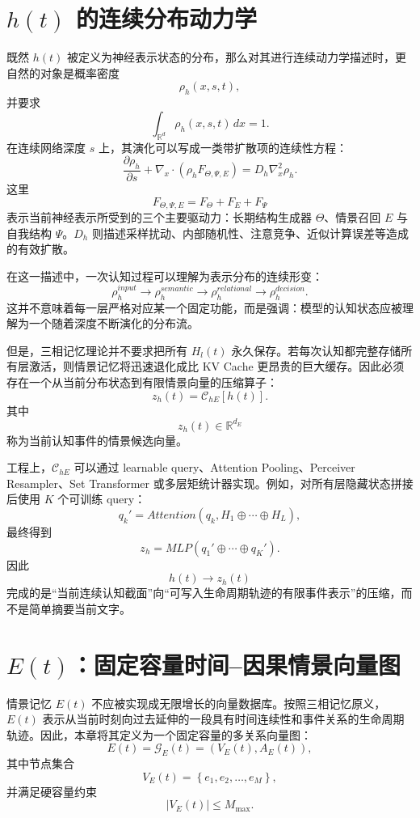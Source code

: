 \section{$h(t)$ 的连续分布动力学}

既然 $h(t)$ 被定义为神经表示状态的分布，那么对其进行连续动力学描述时，更自然的对象是概率密度
\[
\rho_h(x,s,t),
\]
并要求
\[
\int_{\mathbb{R}^{d}}
\rho_h(x,s,t)\,dx
=
1.
\]
在连续网络深度 $s$ 上，其演化可以写成一类带扩散项的连续性方程：
\[
\frac{\partial \rho_h}{\partial s}
+
\nabla_x\cdot
\left(
\rho_h F_{\Theta,\Psi,E}
\right)
=
D_h\nabla_x^2\rho_h.
\]
这里
\[
F_{\Theta,\Psi,E}
=
F_\Theta
+
F_E
+
F_\Psi
\]
表示当前神经表示所受到的三个主要驱动力：长期结构生成器 $\Theta$、情景召回 $E$ 与自我结构 $\Psi$。$D_h$ 则描述采样扰动、内部随机性、注意竞争、近似计算误差等造成的有效扩散。

在这一描述中，一次认知过程可以理解为表示分布的连续形变：
\[
\rho_h^{input}
\rightarrow
\rho_h^{semantic}
\rightarrow
\rho_h^{relational}
\rightarrow
\rho_h^{decision}.
\]
这并不意味着每一层严格对应某一个固定功能，而是强调：模型的认知状态应被理解为一个随着深度不断演化的分布流。

但是，三相记忆理论并不要求把所有 $H_l(t)$ 永久保存。若每次认知都完整存储所有层激活，则情景记忆将迅速退化成比 KV Cache 更昂贵的巨大缓存。因此必须存在一个从当前分布状态到有限情景向量的压缩算子：
\[
z_h(t)
=
\mathcal{C}_{hE}
\left[
h(t)
\right].
\]
其中
\[
z_h(t)\in\mathbb{R}^{d_E}
\]
称为当前认知事件的情景候选向量。

工程上，$\mathcal{C}_{hE}$ 可以通过 learnable query、Attention Pooling、Perceiver Resampler、Set Transformer 或多层矩统计器实现。例如，对所有层隐藏状态拼接后使用 $K$ 个可训练 query：
\[
q_k'
=
Attention
\left(
q_k,
H_1\oplus\cdots\oplus H_L
\right),
\]
最终得到
\[
z_h
=
MLP
\left(
q_1'\oplus\cdots\oplus q_K'
\right).
\]
因此
\[
\boxed{
h(t)
\rightarrow
z_h(t)
}
\]
完成的是“当前连续认知截面”向“可写入生命周期轨迹的有限事件表示”的压缩，而不是简单摘要当前文字。

\section{$E(t)$：固定容量时间--因果情景向量图}

情景记忆 $E(t)$ 不应被实现成无限增长的向量数据库。按照三相记忆原义，$E(t)$ 表示从当前时刻向过去延伸的一段具有时间连续性和事件关系的生命周期轨迹。因此，本章将其定义为一个固定容量的多关系向量图：
\[
E(t)
=
\mathcal{G}_E(t)
=
\left(
V_E(t),A_E(t)
\right),
\]
其中节点集合
\[
V_E(t)
=
\left\{
e_1,e_2,\ldots,e_M
\right\},
\]
并满足硬容量约束
\[
|V_E(t)|
\leq
M_{\max}.
\]

